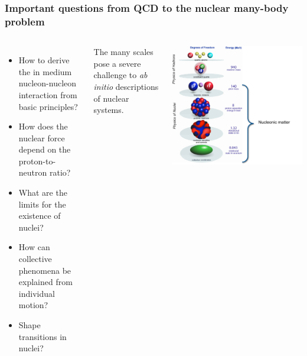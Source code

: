 \documentclass[compress]{beamer}
\begin{document}
\frame
    {
      \frametitle{Important questions from QCD to the nuclear many-body problem}
	
      \begin{footnotesize}
     \begin{columns}
      \column{5.0cm}
\begin{itemize}
\item How to derive the in medium nucleon-nucleon interaction from basic principles?
\item How does the nuclear force depend on the proton-to-neutron ratio?
\item What are the limits for the existence of nuclei?
\item How can collective phenomena be explained from individual motion?
\item Shape transitions in nuclei?
\end{itemize}
The many scales pose a severe challenge to {\em ab initio} descriptions of nuclear systems.
\column{5cm}
      \begin{center}
	\includegraphics[width=1.3\textwidth]{Figures/witek8.pdf}
      \end{center}
\end{columns}
      \end{footnotesize}
    }
\end{document}
